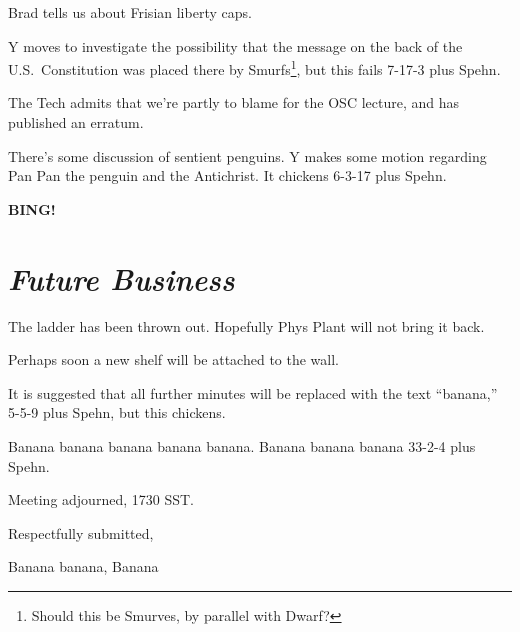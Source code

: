 \documentclass[10pt]{article}
\newcommand{\bing}{{\bf BING!} }
\newcommand{\goto}[1]{\bing \vskip 12pt \section*{{\em{#1}}}}
\newcommand{\ps}{ plus Spehn\xspace}
\begin{document}
Brad tells us about Frisian liberty caps.

Y moves to investigate the possibility that the message on the back of
the U.S.~Constitution was placed there by Smurfs\footnote{Should this
  be Smurves, by parallel with Dwarf?}, but this fails 7-17-3\ps.

The Tech admits that we're partly to blame for the OSC lecture, and
has published an erratum.

There's some discussion of sentient penguins.  Y makes some motion
regarding Pan Pan the penguin and the Antichrist.  It chickens 6-3-17\ps.

\goto{Future Business}
The ladder has been thrown out.  Hopefully Phys Plant will not bring
it back.

Perhaps soon a new shelf will be attached to the wall.

It is suggested  that all further minutes will be replaced with the text
``banana,'' 5-5-9\ps, but this chickens.

Banana banana banana banana banana.  Banana banana banana 33-2-4\ps.

\vspace{12pt}

\noindent
Meeting adjourned, 1730 SST.

\vspace{18pt}

\centerline{Respectfully submitted,}
\centerline{Banana banana, Banana}
\end{document}
